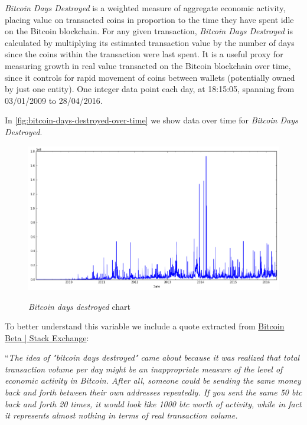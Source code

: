\textit{Bitcoin Days Destroyed} is a weighted measure of aggregate
economic activity, placing value on transacted coins in proportion to
the time they have spent idle on the Bitcoin blockchain. For any given
transaction, \textit{Bitcoin Days Destroyed} is calculated by
multiplying its estimated transaction value by the number of days
since the coins within the transaction were last spent. It is a useful
proxy for measuring growth in real value transacted on the Bitcoin
blockchain over time, since it controls for rapid movement of coins
between wallets (potentially owned by just one entity). One integer
data point each day, at 18:15:05, spanning from 03/01/2009 to
28/04/2016.

In \autoref{fig:bitcoin-days-destroyed-over-time} we show data over
time for \textit{Bitcoin Days Destroyed}.

\begin{figure}[bth]
  \myfloatalign
  {\includegraphics[width=1\linewidth]
    {gfx/bitcoin-days-destroyed-over-time}}
  \caption{\textit{Bitcoin days destroyed} chart}
  \label{fig:bitcoin-days-destroyed-over-time}
\end{figure}

To better understand this variable we include a quote extracted from
\href{http://bitcoin.stackexchange.com/questions/845/what-are-bitcoin-days-destroyed}{Bitcoin
  Beta | Stack Exchange}:

``\textit{The idea of "bitcoin days destroyed" came about because it
  was realized that total transaction volume per day might be an
  inappropriate measure of the level of economic activity in Bitcoin.
  After all, someone could be sending the same money back and forth
  between their own addresses repeatedly. If you sent the same 50 btc
  back and forth 20 times, it would look like 1000 btc worth of
  activity, while in fact it represents almost nothing in terms of
  real transaction volume.}

